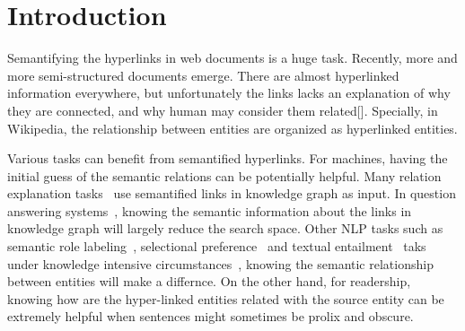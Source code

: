 \section{Introduction}


Semantifying the hyperlinks in web documents is a huge task. 
Recently, more and more semi-structured documents emerge. 
There are almost hyperlinked information everywhere, but unfortunately the links lacks an explanation of why they are connected, and why human may consider them related[]. 
Specially, in Wikipedia, the relationship between entities are organized as hyperlinked entities.

Various tasks can benefit from semantified hyperlinks.
For machines, having the initial guess of the semantic relations can be potentially helpful. 
Many relation explanation tasks~\cite{fang2011rex,nakashole2012discovering,voskarideslearning} use semantified links in knowledge graph as input.
In question answering systems~\cite{yang2014slq}, knowing the semantic information about the links in knowledge graph will largely reduce the search space.
Other NLP tasks such as semantic role labeling~\cite{palmer2010semantic}, selectional preference~\cite{pantel2007isp} and textual entailment~\cite{androutsopoulos2010survey} taks under knowledge intensive circumstances~\cite{yao2012unsupervised,exner2011using}, knowing the semantic relationship between entities will make a differnce.
On the other hand, for readership, knowing how are the hyper-linked entities related with the source entity can be extremely helpful when sentences might sometimes be prolix and obscure.


